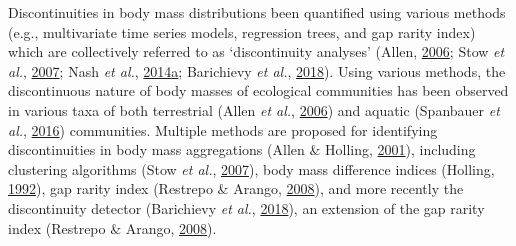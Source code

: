 \documentclass[print]{nuthesis}
\begin{document}
Discontinuities in body mass distributions been quantified using various methods (e.g., multivariate time series models, regression trees, and gap rarity index) which are collectively referred to as `discontinuity analyses' (Allen, \protect\hyperlink{ref-allen2006discontinuities}{2006}; Stow \emph{et al.}, \protect\hyperlink{ref-stow2007evaluating}{2007}; Nash \emph{et al.}, \protect\hyperlink{ref-nash2014discontinuities}{2014}\protect\hyperlink{ref-nash2014discontinuities}{a}; Barichievy \emph{et al.}, \protect\hyperlink{ref-barichievy2018method}{2018}). Using various methods, the discontinuous nature of body masses of ecological communities has been observed in various taxa of both terrestrial (Allen \emph{et al.}, \protect\hyperlink{ref-allen2006patterns}{2006}) and aquatic (Spanbauer \emph{et al.}, \protect\hyperlink{ref-spanbauer2016body}{2016}) communities. Multiple methods are proposed for identifying discontinuities in body mass aggregations (Allen \& Holling, \protect\hyperlink{ref-allen2001cross}{2001}), including clustering algorithms (Stow \emph{et al.}, \protect\hyperlink{ref-stow2007evaluating}{2007}), body mass difference indices (Holling, \protect\hyperlink{ref-holling1992cross}{1992}), gap rarity index (Restrepo \& Arango, \protect\hyperlink{ref-restrepo2008discontinuities}{2008}), and more recently the discontinuity detector (Barichievy \emph{et al.}, \protect\hyperlink{ref-barichievy2018method}{2018}), an extension of the gap rarity index (Restrepo \& Arango, \protect\hyperlink{ref-restrepo2008discontinuities}{2008}).
\end{document}

